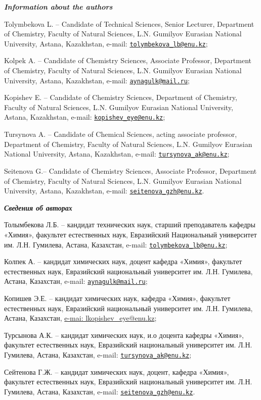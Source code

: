 \begin{authorinfo}
\hspace{1em}\emph{{\bfseries Information about the authors}}

Tolymbekova L. -- Candidate of Technical Sciences, Senior Lecturer,
Department of Chemistry, Faculty of Natural Sciences, L.N. Gumilyov
Eurasian National University, Astana, Kazakhstan, e-mail:
\href{mailto:tolymbekova\_lb@enu.kz}{\nolinkurl{tolymbekova\_lb@enu.kz}};

Kolpek A. -- Candidate of Chemistry Sciences, Associate Professor,
Department of Chemistry, Faculty of Natural Sciences, L.N. Gumilyov
Eurasian National University, Astana, Kazakhstan, e-mail:
\href{mailto:aynagulk@mail.ru}{\nolinkurl{aynagulk@mail.ru}};

Kopishev E. -- Candidate of Chemistry Sciences, Department of Chemistry,
Faculty of Natural Sciences, L.N. Gumilyov Eurasian National University,
Astana, Kazakhstan, e-mail:
\href{mailto:kopishev\_eye@enu.kz}{\nolinkurl{kopishev\_eye@enu.kz}};

Tursynova A. -- Сandidate of Chemical Sciences, acting associate
professor, Department of Chemistry, Faculty of Natural Sciences, L.N.
Gumilyov Eurasian National University, Astana, Kazakhstan, e-mail:
\href{mailto:tursynova\_ak@enu.kz}{\nolinkurl{tursynova\_ak@enu.kz}};

Seitenova G.-- Candidate of Chemistry Sciences, Associate Professor,
Department of Chemistry, Faculty of Natural Sciences, L.N. Gumilyov
Eurasian National University, Astana, Kazakhstan, e-mail:
\href{mailto:seitenova\_gzh@enu.kz}{\nolinkurl{seitenova\_gzh@enu.kz}}.

\hspace{1em}\emph{{\bfseries Сведения об авторах}}

Толымбекова Л.Б. -- кандидат технических наук, старший преподаватель
кафедры «Химия», факультет естественных наук, Евразийский Национальный
университет им. Л.Н. Гумилева, Астана, Казахстан, e-mail:
\href{mailto:tolymbekova\_lb@enu.kz}{\nolinkurl{tolymbekova\_lb@enu.kz}};

Колпек А. -- кандидат химических наук, доцент кафедра «Химия», факультет
естественных наук, Евразийский национальный университет им. Л.Н.
Гумилева, Астана, Казахстан, e-mail:
\href{mailto:aynagulk@mail.ru}{\nolinkurl{aynagulk@mail.ru}};

Копишев Э.Е. -- кандидат химических наук, кафедра «Химия», факультет
естественных наук, Евразийский национальный университет им. Л.Н.
Гумилева, Астана, Казахстан,
\href{mailto:e-mai:\%20lkopishev\_eye@enu.kz}{e-mai:
lkopishev\_eye@enu.kz};

Турсынова А.К. -- кандидат химических наук, и.о доцента кафедры «Химия»,
факультет естественных наук, Евразийский национальный университет им.
Л.Н. Гумилева, Астана, Казахстан, e-mail:
\href{mailto:tursynova\_ak@enu.kz}{\nolinkurl{tursynova\_ak@enu.kz}};

Сейтенова Г.Ж. -- кандидат химических наук, доцент, кафедра «Химия»,
факультет естественных наук, Евразийский национальный университет им.
Л.Н. Гумилева, Астана, Казахстан, e-mail:
\href{mailto:seitenova\_gzh@enu.kz}{\nolinkurl{seitenova\_gzh@enu.kz}}.
\end{authorinfo}
